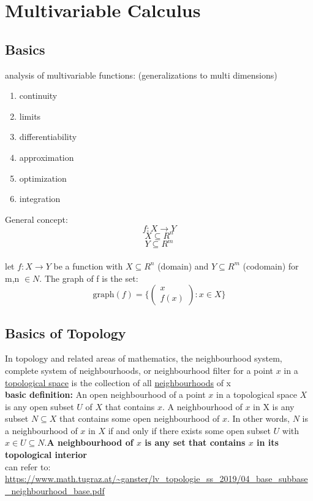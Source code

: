 \documentclass{article}
\begin{document}
\section*{Multivariable Calculus}
\subsection*{Basics}
analysis of multivariable functions: (generalizations to multi dimensions)
\begin{enumerate}
    \item continuity
    \item limits
    \item differentiability
    \item approximation
    \item optimization
    \item integration
\end{enumerate}
General concept: \newline
\begin{equation*} f: X \rightarrow Y \end{equation*}
\begin{equation*} \tag{multivariable} X \subseteq R^{n} \label{multivariable}\end{equation*} 
\begin{equation*} \tag{vector-valued} Y \subseteq R^{m} \label{vector-valued} \end{equation*}
\\[4pt]
let $f:X \rightarrow Y$ be a function with $X \subseteq R^{n}$ (domain) and $Y \subseteq R^{m}$ (codomain) for m,n $\in N$. The graph of f is the set: \\
\begin{equation*} \text{graph}(f) = \{\begin{pmatrix} x \\ f(x) \end{pmatrix} : x \in X \} \end{equation*} 
\subsection*{Basics of Topology}
In topology and related areas of mathematics, the neighbourhood system, complete system of neighbourhoods, or neighbourhood filter for a point $x$ in a \underline{topological space} is the collection of all \underline{neighbourhoods} of x \\
\textbf{basic definition:}
An open neighbourhood of a point $x$ in a topological space $X$ is any open subset $U$ of $X$ that contains $x$. A neighbourhood of $x$ in X is any subset $N \subseteq X$ that contains some open neighbourhood of $x$. In other words, $N$ is a neighbourhood of $x$ in $X$ if and only if there exists some open subset $U$ with $x \in U \subseteq N$.\textbf{A neighbourhood of $x$ is any set that contains $x$ in its topological interior}
\\ can refer to: \\ \url{https://www.math.tugraz.at/~ganster/lv_topologie_ss_2019/04_base_subbase_neighbourhood_base.pdf}
\end{document}
